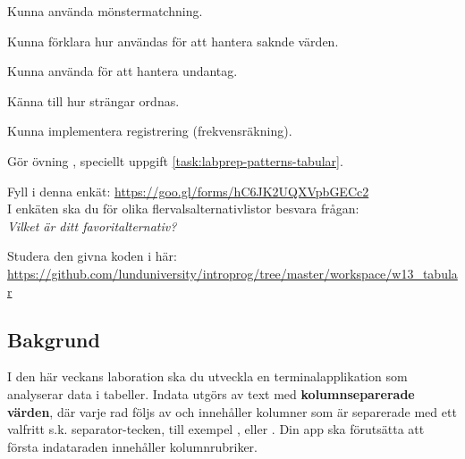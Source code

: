 
\Lab{\LabWeekTEN}

\begin{Goals}
\item Kunna använda mönstermatchning.
\item Kunna förklara hur  användas för att hantera saknde värden.
\item Kunna använda  för att hantera undantag.
\item Känna till hur strängar ordnas.
\item Kunna implementera registrering (frekvensräkning).
\end{Goals}

\begin{Preparations}
\item Gör övning {\texttt{\ExeWeekTEN}}, speciellt uppgift \ref{task:labprep-patterns-tabular}.
\item \ReadTheLab
\item Fyll i denna enkät: \url{https://goo.gl/forms/hC6JK2UQXVpbGECc2}  \\
I enkäten ska du för olika flervalsalternativlistor besvara frågan: \\ \textit{Vilket är ditt favoritalternativ?}
\item Studera den givna koden i  här: \url{https://github.com/lunduniversity/introprog/tree/master/workspace/w13_tabular}
\end{Preparations}


\subsection{Bakgrund}

I den här veckans laboration ska du utveckla en terminalapplikation som analyserar data i tabeller. Indata utgörs av text med \textbf{kolumnseparerade värden}, där varje rad följs av  och innehåller kolumner som är separerade med ett valfritt s.k. separator-tecken, till exempel ,  eller . Din app ska förutsätta att första indataraden innehåller kolumnrubriker.

